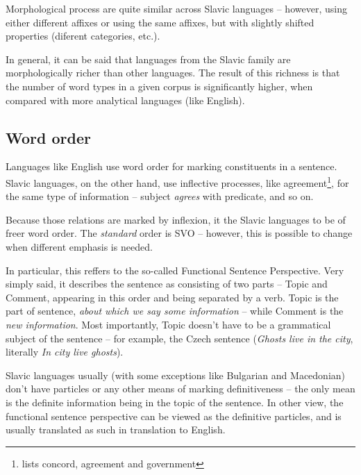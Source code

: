 Morphological process are quite similar across Slavic languages -- however, using either different affixes or using the same affixes, but with slightly shifted properties (diferent categories, etc.).


In general, it can be said that languages from the Slavic family are morphologically richer than other languages. The result of this richness is that the number of word types in a given corpus is significantly higher, when compared with more analytical languages (like English). %
\subsection{Word order}

Languages like English use word order for marking constituents
in a sentence. Slavic languages, on the other hand, use inflective processes, like agreement\footnote{\cite{sussex2011slavic} lists concord, agreement and government}, for the same type of information -- subject \emph{agrees} with predicate, and so on.

Because those relations are marked by inflexion, it  the Slavic languages to be of freer word order. The \emph{standard} order is SVO -- however, this is possible to change when different emphasis is needed.

In particular, this reffers to the so-called Functional Sentence Perspective. Very simply said, it describes the sentence as consisting of two parts -- Topic and Comment, appearing in this order and being separated by a verb. Topic is the part of sentence, \emph{about which we say some information} -- while Comment is the \emph{new information}. Most importantly, Topic doesn't have to be a grammatical subject of the sentence -- for example, the Czech sentence  (\emph{Ghosts live in the city}, literally \emph{In city live ghosts}).

Slavic languages usually (with some exceptions like Bulgarian and Macedonian) don't have particles or any other means of marking definitiveness -- the only mean is the definite information being in the topic of the sentence. In other view, the functional sentence perspective can be viewed as  the definitive particles, and is usually translated as such in translation to English.

